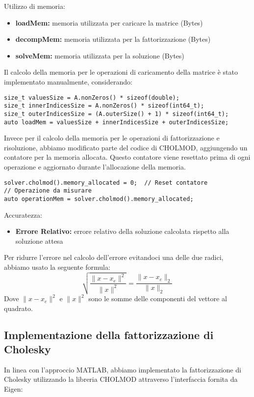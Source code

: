 Utilizzo di memoria:
\begin{itemize}
    \item \textbf{loadMem:} memoria utilizzata per caricare la matrice (Bytes)
    \item \textbf{decompMem:} memoria utilizzata per la fattorizzazione (Bytes)
    \item \textbf{solveMem:} memoria utilizzata per la soluzione (Bytes)
\end{itemize}

Il calcolo della memoria per le operazioni di caricamento della matrice è stato implementato manualmente, considerando:
\begin{verbatim}
size_t valuesSize = A.nonZeros() * sizeof(double);
size_t innerIndicesSize = A.nonZeros() * sizeof(int64_t);
size_t outerIndicesSize = (A.outerSize() + 1) * sizeof(int64_t);
auto loadMem = valuesSize + innerIndicesSize + outerIndicesSize;
\end{verbatim}

Invece per il calcolo della memoria per le operazioni di fattorizzazione e risoluzione, abbiamo modificato parte del codice di CHOLMOD, 
aggiungendo un contatore per la memoria allocata. Questo contatore viene resettato prima di ogni operazione e 
aggiornato durante l'allocazione della memoria.

\begin{verbatim}
solver.cholmod().memory_allocated = 0;  // Reset contatore
// Operazione da misurare
auto operationMem = solver.cholmod().memory_allocated;
\end{verbatim}

Accuratezza:
\begin{itemize}
    \item \textbf{Errore Relativo:} errore relativo della soluzione calcolata rispetto alla soluzione attesa
\end{itemize}

Per ridurre l'errore nel calcolo dell'errore evitandoci una delle due radici, abbiamo usato la seguente formula: \[\sqrt{ \frac{ \| x - x_e \|^2 }{ \| x \|^2 } } = \frac{ \| x - x_e \|_2 }{ \| x \|_2 }\]
Dove \(\| x - x_e \|^2\) e \(\| x \|^2\) sono le somme delle componenti del vettore al quadrato.

\subsection{Implementazione della fattorizzazione di Cholesky}

In linea con l'approccio MATLAB, abbiamo implementato la fattorizzazione di Cholesky utilizzando la libreria CHOLMOD attraverso 
l'interfaccia fornita da Eigen:

